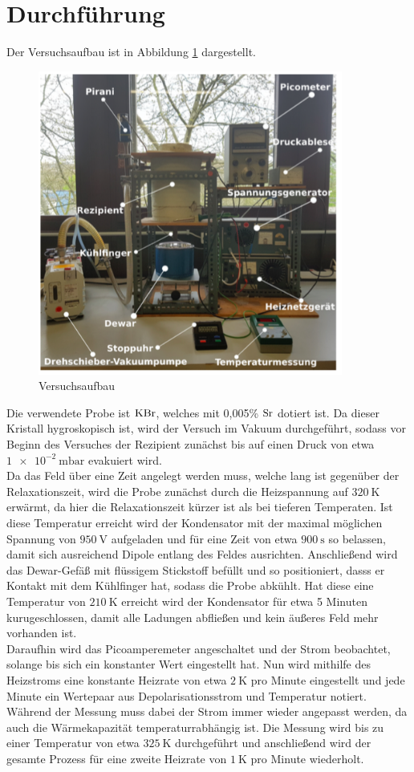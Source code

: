 \section{Durchführung}
\label{sec:Durchführung}
Der Versuchsaufbau ist in Abbildung \ref{fig:aufbau} dargestellt.
\begin{figure}
  \centering
  \includegraphics[width=10cm]{Aufbau.png}
  \caption{Versuchsaufbau \cite{skript}}
  \label{fig:aufbau}
\end{figure}
Die verwendete Probe ist $\ce{KBr}$, welches mit 0,005\% $\ce{Sr}$ dotiert ist.
Da dieser Kristall hygroskopisch ist, wird der Versuch im Vakuum durchgeführt, sodass vor Beginn des
Versuches der Rezipient zunächst bis auf einen Druck von etwa $\SI{1e-2}{\milli\bar}$
evakuiert wird. \\
Da das Feld über eine Zeit angelegt werden muss, welche lang ist gegenüber der Relaxationszeit,
wird die Probe zunächst durch die Heizspannung auf $\SI{320}{\kelvin}$ erwärmt, da hier die Relaxationszeit
kürzer ist als bei tieferen Temperaten. Ist diese Temperatur erreicht wird der Kondensator
mit der maximal möglichen Spannung von $\SI{950}{\volt}$ aufgeladen und für eine Zeit von
etwa $\SI{900}{\second}$ so belassen, damit sich ausreichend Dipole entlang des Feldes ausrichten.
Anschließend wird das Dewar-Gefäß mit flüssigem Stickstoff befüllt und so positioniert,
dasss er Kontakt mit dem Kühlfinger hat, sodass die Probe abkühlt. Hat diese eine Temperatur
von $\SI{210}{\kelvin}$ erreicht wird der Kondensator für etwa 5 Minuten kurugeschlossen, damit alle
Ladungen abfließen und kein äußeres Feld mehr vorhanden ist. \\
Daraufhin wird das Picoamperemeter angeschaltet und der Strom beobachtet, solange bis sich ein
konstanter Wert eingestellt hat. Nun wird mithilfe des Heizstroms eine konstante Heizrate von etwa
$\SI{2}{\kelvin}$ pro Minute eingestellt und jede Minute ein Wertepaar aus Depolarisationsstrom
und Temperatur notiert. Während der Messung muss dabei der Strom immer wieder angepasst werden,
da auch die Wärmekapazität temperaturrabhängig ist. Die Messung wird bis zu einer Temperatur von etwa
$\SI{325}{\kelvin}$ durchgeführt und anschließend wird der gesamte Prozess für eine
zweite Heizrate von $\SI{1}{\kelvin}$ pro Minute wiederholt.
